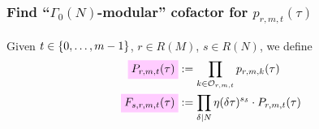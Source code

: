 \documentclass{article}
\begin{document}
\begin{Hemmecke}


\subsubsection{Find ``$\Gamma_0(N)$-modular'' cofactor for $p_{r,m,t}(\tau)$}


\begin{Definition}\cite[Def.~44]{Radu_RamanujanKolberg_2015}
  Given $t\in\left\{0,\ldots,m-1\right\}$, $r \in R(M)$, $s \in R(N)$, we
  define
  \begin{align}
    \defineNotation[P-r-m-t-tau]{P_{r, m, t}(\tau)}
    &:= \prod_{k \in \modularOrbit{r,m,t}} p_{r,m,k}(\tau)\\
    \defineNotation[F-s-r-m-t-tau]{F_{s, r, m, t}(\tau)}
    &:= \divisorprod{N} \eta(\delta\tau)^{s_\delta} \cdot P_{r, m, t}(\tau)
  \end{align}
\end{Definition}


\end{Hemmecke}
\end{document}
